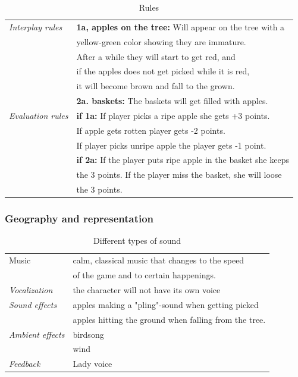 \begin{table} [H]
\centering
    \begin{tabular}{|l|l|}
       \hline
        \emph{Interplay rules} &  \textbf{1a, apples on the tree:} Will appear on the tree with a \\ & yellow-green color showing they are immature. \\ & After a while they will start to get red, and \\ & if the apples does not get picked while it  is red,\\ & it will become brown and fall to the grown. \\ \cline{2-2}
	     & \textbf{2a. baskets:} The baskets will get filled with apples. \\ \hline
	     \emph{Evaluation rules} & \textbf{if 1a:} If player picks a ripe apple she gets +3 points. \\ & If apple gets rotten player gets  -2 points. \\ & If player picks unripe apple the player gets -1 point. \\ \cline{2-2}
	       & \textbf{if 2a:} If the player puts ripe apple in the basket she keeps \\ & the 3 points. If the player miss the basket, she will loose \\ & the 3 points.  \\ \hline
    \end{tabular}
    \caption[Rules for the "Apple Picking" game]{Rules}
    \label{tab:rules2}
\end{table}  

\subsubsection{Geography and representation}

\begin{table} [H]
\centering
    \begin{tabular}{|l|l|}
       \hline
       {Music} & calm, classical music that changes to the speed \\ & of the game and to certain happenings. \\ \hline
       \emph{Vocalization} & the character will not have its own voice \\ \hline
       \emph{Sound effects} &   apples making a "pling"-sound when getting picked  \\ \cline{2-2}
	    &  apples hitting the ground when falling from the tree. \\ \hline
	       \emph{Ambient effects} & birdsong \\ \cline{2-2}
	         & wind \\ \hline
	         \emph{Feedback} & Lady voice \\ \hline
    \end{tabular}
    \caption[Different types of sounds in the "Apple Picking" game]{Different types of sound}
    \label{tab:sound2}
\end{table}  


